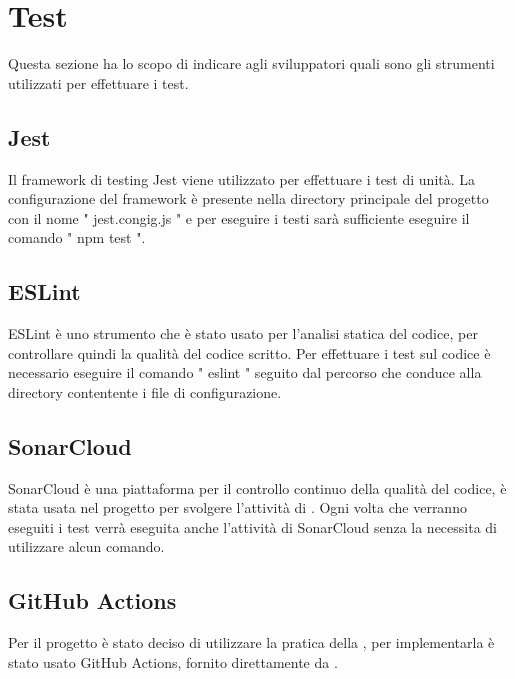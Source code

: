 \section{Test}
Questa sezione ha lo scopo di indicare agli sviluppatori quali sono gli strumenti utilizzati per effettuare i test.
\subsection{Jest}
Il framework di testing Jest viene utilizzato per effettuare i test di unità. La configurazione del framework è presente nella directory principale del progetto con il nome " jest.congig.js " e per eseguire i testi sarà sufficiente eseguire il comando " npm test ".
\subsection{ESLint}
ESLint è uno strumento che è stato usato per l'analisi statica del codice, per controllare quindi la qualità del codice scritto.
Per effettuare i test sul codice è necessario eseguire il comando " eslint " seguito dal percorso che conduce alla directory contentente i file di configurazione.
\subsection{SonarCloud}
SonarCloud è una piattaforma per il controllo continuo della qualità del codice, è stata usata nel progetto per svolgere l'attività di . Ogni volta che verranno eseguiti i test verrà eseguita anche l'attività di SonarCloud senza la necessita di utilizzare alcun comando.
\subsection{GitHub Actions}
Per il progetto è stato deciso di utilizzare la pratica della , per implementarla è stato usato GitHub Actions, fornito direttamente da .